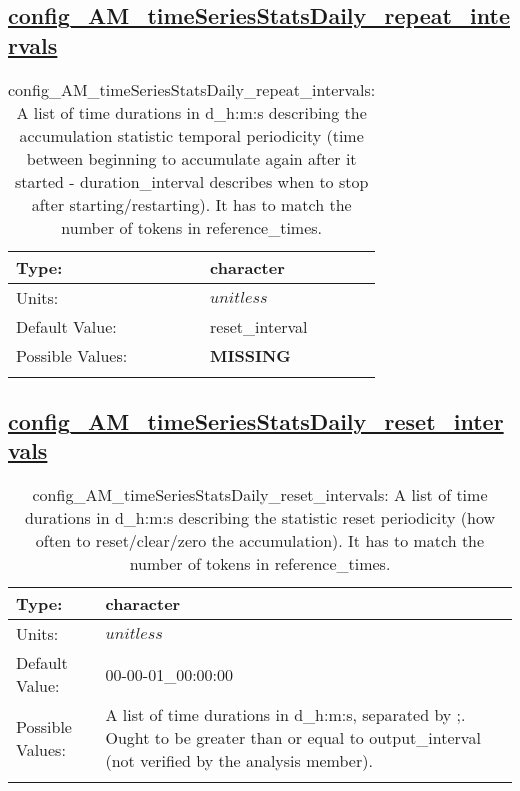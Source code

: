 \subsection[config\_AM\_timeSeriesStatsDaily\_repeat\_intervals]{\hyperref[sec:nm_tab_AM_timeSeriesStatsDaily]{config\_AM\_timeSeriesStatsDaily\_repeat\_intervals}}
\label{subsec:nm_sec_config_AM_timeSeriesStatsDaily_repeat_intervals}
\begin{center}
\begin{longtable}{| p{2.0in} || p{4.0in} |}
    \hline
    Type: & character \\
    \hline
    Units: & $unitless$ \\
    \hline
    Default Value: & reset\_interval \\
    \hline
    Possible Values: & {\bf \color{red} MISSING} \\
    \hline
    \caption{config\_AM\_timeSeriesStatsDaily\_repeat\_intervals: A list of time durations in d\_h:m:s describing the accumulation statistic temporal periodicity (time between beginning to accumulate again after it started - duration\_interval describes when to stop after starting/restarting). It has to match the number of tokens in reference\_times.}
\end{longtable}
\end{center}
\subsection[config\_AM\_timeSeriesStatsDaily\_reset\_intervals]{\hyperref[sec:nm_tab_AM_timeSeriesStatsDaily]{config\_AM\_timeSeriesStatsDaily\_reset\_intervals}}
\label{subsec:nm_sec_config_AM_timeSeriesStatsDaily_reset_intervals}
\begin{center}
\begin{longtable}{| p{2.0in} || p{4.0in} |}
    \hline
    Type: & character \\
    \hline
    Units: & $unitless$ \\
    \hline
    Default Value: & 00-00-01\_00:00:00 \\
    \hline
    Possible Values: & A list of time durations in d\_h:m:s, separated by ;. Ought to be greater than or equal to output\_interval (not verified by the analysis member). \\
    \hline
    \caption{config\_AM\_timeSeriesStatsDaily\_reset\_intervals: A list of time durations in d\_h:m:s describing the statistic reset periodicity (how often to reset/clear/zero the accumulation). It has to match the number of tokens in reference\_times.}
\end{longtable}
\end{center}
